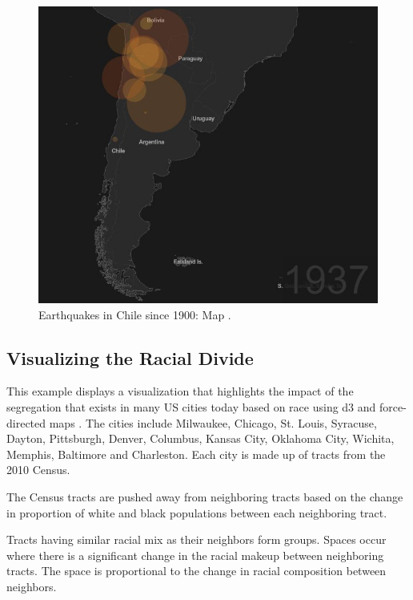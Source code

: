 \documentclass[9pt,twocolumn,twoside]{../../styles/osajnl}
\begin{document}
\begin{figure}[h]
\centering
\includegraphics[scale=0.3]{images/3}
\centering
\caption{Earthquakes in Chile since 1900: Map \cite{www-map}.}
\end{figure}
\subsection{Visualizing the Racial Divide}
This example displays a visualization that highlights the impact of the segregation that exists in many US cities today based on race using d3 and force-directed maps \cite{www-fdm}. The cities include Milwaukee, Chicago, St. Louis, Syracuse, Dayton, Pittsburgh, Denver, Columbus, Kansas City, Oklahoma City, Wichita, Memphis, Baltimore and Charleston. Each city is made up of tracts from the 2010 Census.

The Census tracts are pushed away from neighboring tracts based on the change in proportion of white and black populations between each neighboring tract.

Tracts having similar racial mix as their neighbors form groups. Spaces occur where there is a significant change in the racial makeup between neighboring tracts. The space is proportional to the change in racial composition between neighbors.
\end{document}
